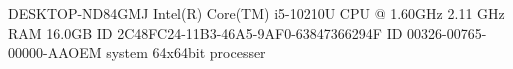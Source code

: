 DESKTOP-ND84GMJ
Intel(R) Core(TM) i5-10210U CPU @ 1.60GHz   2.11 GHz
RAM	16.0GB
ID	2C48FC24-11B3-46A5-9AF0-63847366294F
ID	00326-00765-00000-AAOEM
system 64x64bit processer


